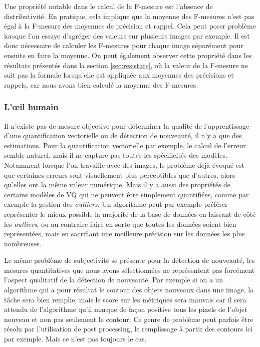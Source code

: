 	Une propriété notable dans le calcul de la F-mesure est l'absence de distributivité. En pratique, cela implique que la moyenne des F-mesures n'est pas égal à la F-mesure des moyennes de précision et rappel. Cela peut poser problème lorsque l'on essaye d'agréger des valeurs sur plusieurs images par exemple. Il est donc nécessaire de calculer les F-mesures pour chaque image séparément pour ensuite en faire la moyenne. On peut également observer cette propriété dans les résultats présentés dans la section \ref{sec:res:stats}, où la valeur de la F-mesure ne suit pas la formule lorsqu'elle est appliquée aux moyennes des précisions et rappels, car nous avons bien calculé la moyenne des F-mesures.

	\subsubsection{L'œil humain}

	Il n'existe pas de mesure objective pour déterminer la qualité de l'apprentissage d'une quantification vectorielle ou de détection de nouveauté, il n'y a que des estimations. Pour la quantification vectorielle par exemple, le calcul de l'erreur semble naturel, mais il ne capture pas toutes les spécificités des modèles. Notamment lorsque l'on travaille avec des images, le problème déjà évoqué est que certaines erreurs sont visuellement plus perceptibles que d'autres, alors qu'elles ont la même valeur numérique. Mais il y a aussi des propriétés de certains modèles de VQ qui ne peuvent être simplement quantifiées, comme par exemple la gestion des \textit{outliers}. Un algorithme peut par exemple préférer représenter le mieux possible la majorité de la base de données en laissant de côté les \textit{outliers}, ou au contraire faire en sorte que toutes les données soient bien représentées, mais en sacrifiant une meilleure précision sur les données les plus nombreuses. 
	
	Le même problème de subjectivité se présente pour la détection de nouveauté, les mesures quantitatives que nous avons sélectionnées ne représentent pas forcément l'aspect qualitatif de la détection de nouveauté. Par exemple si on a un algorithme qui a pour résultat le contour des objets nouveaux dans une image, la tâche sera bien remplie, mais le score sur les métriques sera mauvais car il sera attendu de l'algorithme qu'il marque de façon positive tous les pixels de l'objet nouveau et non pas seulement le contour. Ce genre de problème peut parfois être résolu par l'utilisation de post processing, le remplissage à partir des contours ici par exemple. Mais ce n'est pas toujours le cas.

